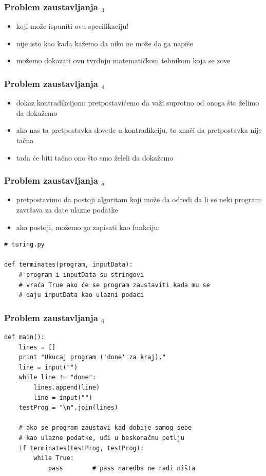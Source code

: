 \documentclass[utf8,compress]{beamer}
\begin{document}
\begin{frame}[fragile]
  \frametitle{Problem zaustavljanja $_3$}
  \begin{itemize}
    \item {} koji može ispuniti ovu specifikaciju!
    \item nije isto kao kada kažemo da niko ne može da ga napiše
    \item možemo dokazati ovu tvrdnju matematičkom tehnikom koja se zove 
  \end{itemize}
\end{frame}

\begin{frame}[fragile]
  \frametitle{Problem zaustavljanja $_4$}
  \begin{itemize}
    \item dokaz kontradikcijom: pretpostavićemo da važi suprotno od onoga što želimo da dokažemo
    \item ako nas ta pretpostavka dovede u kontradikciju, to znači da pretpostavka nije tačna
    \item tada će biti tačno ono što smo želeli da dokažemo
  \end{itemize}
\end{frame}

\begin{frame}[fragile]
  \frametitle{Problem zaustavljanja $_5$}
  \begin{itemize}
    \item pretpostavimo da postoji algoritam koji može da odredi da li se neki program završava za date ulazne podatke
    \item ako postoji, možemo ga zapisati kao funkciju:
  \end{itemize}
\begin{verbatim}
# turing.py

def terminates(program, inputData):
    # program i inputData su stringovi
    # vraća True ako će se program zaustaviti kada mu se
    # daju inputData kao ulazni podaci
\end{verbatim}
\end{frame}

\begin{frame}[fragile]
  \frametitle{Problem zaustavljanja $_6$}
\begin{verbatim}
def main():
    lines = []
    print "Ukucaj program ('done' za kraj)."
    line = input("")
    while line != "done":
        lines.append(line)
        line = input("")
    testProg = "\n".join(lines)

    # ako se program zaustavi kad dobije samog sebe 
    # kao ulazne podatke, uđi u beskonačnu petlju
    if terminates(testProg, testProg):
        while True:
            pass        # pass naredba ne radi ništa
\end{verbatim}
\end{frame}
\end{document}
